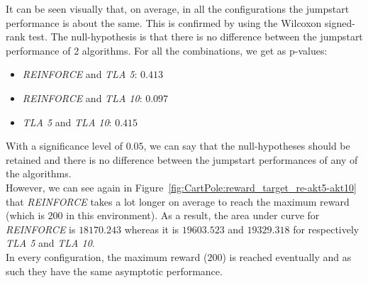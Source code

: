It can be seen visually that, on average, in all the configurations the jumpstart performance is about the same. This is confirmed by using the Wilcoxon signed-rank test. The null-hypothesis is that there is no difference between the jumpstart performance of 2 algorithms. For all the combinations, we get as p-values:
\begin{itemize}
    \item \textit{REINFORCE} and \textit{TLA 5}: $0.413$
    \item \textit{REINFORCE} and \textit{TLA 10}: $0.097$
    \item \textit{TLA 5} and \textit{TLA 10}: $0.415$
\end{itemize}
With a significance level of $0.05$, we can say that the null-hypotheses should be retained and there is no difference between the jumpstart performances of any of the algorithms.\\
However, we can see again in Figure~\ref{fig:CartPole:reward_target_re-akt5-akt10} that \textit{REINFORCE} takes a lot longer on average to reach the maximum reward (which is $200$ in this environment). As a result, the area under curve for \textit{REINFORCE} is $18170.243$ whereas it is $19603.523$ and $19329.318$ for respectively \textit{TLA 5} and \textit{TLA 10}.\\
In every configuration, the maximum reward ($200$) is reached eventually and as such they have the same asymptotic performance.\\


